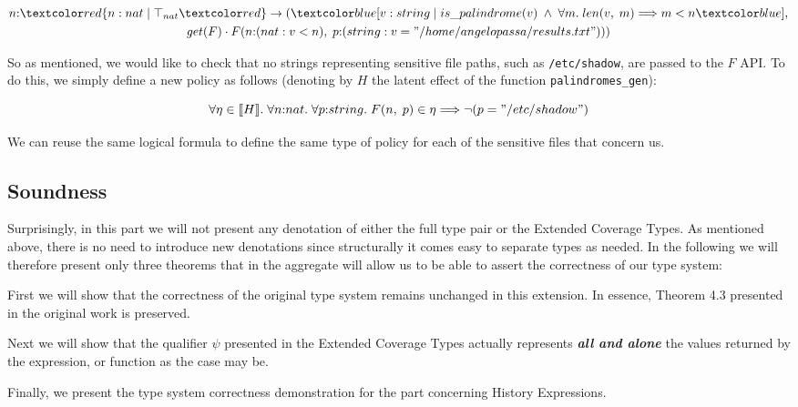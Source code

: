 \vspace{25pt}

\begin{equation}
    \begin{gathered}
         n{:}\overa{n: nat \;|\; \top_{nat}} \rightarrow (\under{v: string \;|\; is\_palindrome(v) \;\land\; \forall m. \;len(v, \;m) \Longrightarrow m < n}, \\
         get(F) \cdot F(n{:}(nat: v < n), \;p{:}(string: v = "/home/angelopassa/results.txt")))
    \end{gathered}
\end{equation}

So as mentioned, we would like to check that no strings representing sensitive file paths, such as \verb|/etc/shadow|, are passed to the $F$ API. To do this, we simply define a new policy as follows (denoting by $H$ the latent effect of the function \verb|palindromes_gen|):

\begin{equation}
    \forall \eta \in \llbracket H \rrbracket. \;\forall n{:}nat. \;\forall p{:}string. \;F(n, \;p) \in \eta \Longrightarrow \neg(p = "/etc/shadow")
\end{equation}

We can reuse the same logical formula to define the same type of policy for each of the sensitive files that concern us.

\subsection{Soundness}

Surprisingly, in this part we will not present any denotation of either the full type pair or the Extended Coverage Types. As mentioned above, there is no need to introduce new denotations since structurally it comes easy to separate types as needed. In the following we will therefore present only three theorems that in the aggregate will allow us to be able to assert the correctness of our type system:
\begin{enumerate*}[label=(\roman*)]
    \item First we will show that the correctness of the original type system remains unchanged in this extension. In essence, Theorem 4.3 presented in the original work \cite{coverage} is preserved.
    \item Next we will show that the qualifier $\psi$ presented in the Extended Coverage Types actually represents \textbf{\emph{all and alone}} the values returned by the expression, or function as the case may be.
    \item Finally, we present the type system correctness demonstration for the part concerning History Expressions.
\end{enumerate*}

